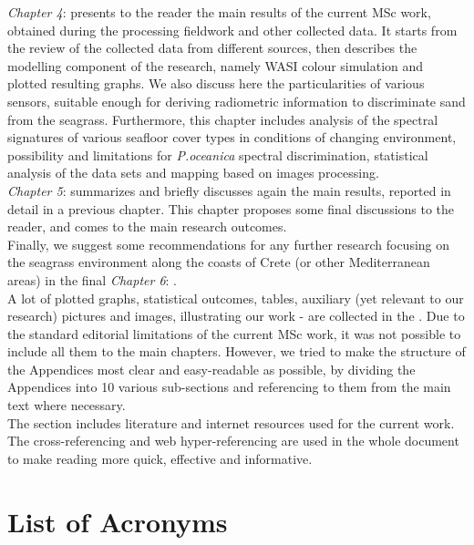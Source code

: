 \documentclass[10pt, a4paper]{article}
\begin{document}
\textit{Chapter 4}:  presents to the reader the main results of the current MSc work, obtained during the processing fieldwork and other collected data. It starts from the review of the collected data from different sources, then describes the modelling component of the research, namely WASI colour simulation and plotted resulting graphs. We also discuss here the particularities of various sensors, suitable enough for deriving radiometric information to discriminate sand from the seagrass. Furthermore, this chapter includes analysis of the spectral signatures of various seafloor cover types in conditions of changing environment, possibility and limitations for \textit{P.oceanica} spectral discrimination, statistical analysis of the data sets and mapping based on images processing.\\
\textit{Chapter 5}:  summarizes and briefly discusses again the main results, reported in detail in a previous chapter. This chapter proposes some final discussions to the reader, and comes to the main research outcomes.\\
Finally, we suggest some recommendations for any further research focusing on the seagrass environment along the coasts of Crete (or other Mediterranean areas) in the final \textit{Chapter 6}: .\\
A lot of plotted graphs, statistical outcomes, tables, auxiliary (yet relevant to our research) pictures and images, illustrating our work - are collected in the . Due to the standard editorial limitations of the current MSc work, it was not possible to include all them to the main chapters. However, we tried to make the structure of the Appendices most clear and easy-readable as possible, by dividing the Appendices into 10 various sub-sections and referencing to them from the main text where necessary. \\
The  section includes literature and internet resources used for the current work. The cross-referencing and web hyper-referencing are used in the whole document to make reading more quick, effective and informative.

\pagebreak

\section*{List of Acronyms}
\onehalfspace
\end{document}
